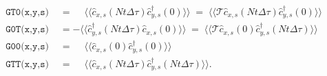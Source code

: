 \begin{align}
\begin{aligned}
\texttt{GT0(x,y,s) }  &=   \phantom{+} \langle \langle \hat{c}^{\phantom\dagger}_{x,s} (Nt \Delta \tau)   \hat{c}^{\dagger}_{y,s} (0)   \rangle \rangle \;=\; \langle \langle \mathcal{T} \hat{c}^{\phantom\dagger}_{x,s} (Nt \Delta \tau)   \hat{c}^{\dagger}_{y,s} (0)   \rangle \rangle   \\
\texttt{G0T(x,y,s) }   &=  -   \langle \langle   \hat{c}^{\dagger}_{y,s} (Nt \Delta \tau)    \hat{c}^{\phantom\dagger}_{x,s} (0)    \rangle \rangle \;=\;
    \langle \langle \mathcal{T} \hat{c}^{\phantom\dagger}_{x,s} (0)    \hat{c}^{\dagger}_{y,s} (Nt \Delta \tau)   \rangle \rangle    \\
  \texttt{G00(x,y,s) }  &=    \phantom{+} \langle \langle \hat{c}^{\phantom\dagger}_{x,s} (0)   \hat{c}^{\dagger}_{y,s} (0)   \rangle \rangle     \\
    \texttt{GTT(x,y,s) }  &=   \phantom{+} \langle \langle \hat{c}^{\phantom\dagger}_{x,s} (Nt \Delta \tau)   \hat{c}^{\dagger}_{y,s} (Nt \Delta \tau)   \rangle \rangle.
\end{aligned}
\end{align}



